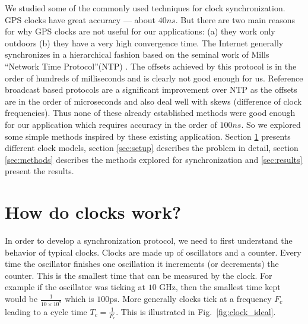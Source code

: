\documentclass[10pt, journal, letter, onecolumn]{IEEEtran}
\begin{document}
We studied some of the commonly used techniques for clock synchronization.
GPS clocks have great accuracy --- about $40 ns$. But there are two main reasons for why GPS clocks are not useful for our applications: (a) they work only outdoors (b) they have a very high convergence time.
The Internet generally synchronizes in a hierarchical fashion based on the seminal work of Mills ``Network Time Protocol''(NTP) \cite{mills1991internet}.
The offsets achieved by this protocol is in the order of hundreds of milliseconds and is clearly not good enough for us.
Reference broadcast based protocols \cite{elson2004global, elson2002fine} are a significant improvement over NTP as the offsets are in the order of microseconds and also deal well with skews (difference of clock frequencies).
Thus none of these already established methods were good enough for our application which requires accuracy in the order of $100 ns$. So we explored some simple methods inspired by these existing application. Section \ref{sec:clock} presents different clock models, section \ref{sec:setup} describes the problem in detail, section \ref{sec:methods} describes the methods explored for synchronization and \ref{sec:results} present the results.

\section{How do clocks work?}
\label{sec:clock}
In order to develop a synchronization protocol, we need to first understand the behavior of typical clocks. Clocks are made up of oscillators and a counter. Every time the oscillator finishes one oscillation it increments (or decrements) the counter. This is the smallest time that can be measured by the clock. For example if the oscillator was ticking at $10$ GHz, then the smallest time kept would be $\frac{1}{10 \times 10^{9}}$ which is $100$ps. More generally clocks tick at a frequency $F_c$ leading to a cycle time $T_c = \frac{1}{F_c}$. This is illustrated in Fig.~\ref{fig:clock_ideal}.
\end{document}

